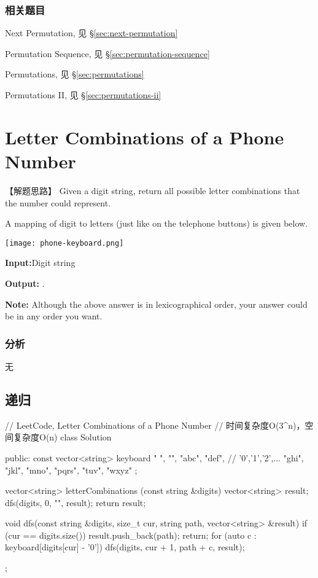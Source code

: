 \subsubsection{相关题目}
\begindot
\item Next Permutation, 见 \S \ref{sec:next-permutation}
\item Permutation Sequence, 见 \S \ref{sec:permutation-sequence}
\item Permutations, 见 \S \ref{sec:permutations}
\item Permutations II, 见 \S \ref{sec:permutations-ii}
\myenddot


\section{Letter Combinations of a Phone Number } %
\label{sec:letter-combinations-of-a-phone-number }


【解题思路】
Given a digit string, return all possible letter combinations that the number could represent.

A mapping of digit to letters (just like on the telephone buttons) is given below.

\begin{center}
	\texttt{[image: phone-keyboard.png]}\\
	\label{fig:phone-keyboard}
\end{center}

\textbf{Input:}Digit string 

\textbf{Output:} \code{["ad", "ae", "af", "bd", "be", "bf", "cd", "ce", "cf"]}.

\textbf{Note:}
Although the above answer is in lexicographical order, your answer could be in any order you want.


\subsubsection{分析}
无


\subsection{递归}
\begin{Code}
	// LeetCode, Letter Combinations of a Phone Number
	// 时间复杂度O(3^n)，空间复杂度O(n)
	class Solution {
		public:
		const vector<string> keyboard { " ", "", "abc", "def", // '0','1','2',...
			"ghi", "jkl", "mno", "pqrs", "tuv", "wxyz" };
		
		vector<string> letterCombinations (const string &digits) {
			vector<string> result;
			dfs(digits, 0, "", result);
			return result;
		}
		
		void dfs(const string &digits, size_t cur, string path,
		vector<string> &result) {
			if (cur == digits.size()) {
				result.push_back(path);
				return;
			}
			for (auto c : keyboard[digits[cur] - '0']) {
				dfs(digits, cur + 1, path + c, result);
			}
		}
	};
\end{Code}



